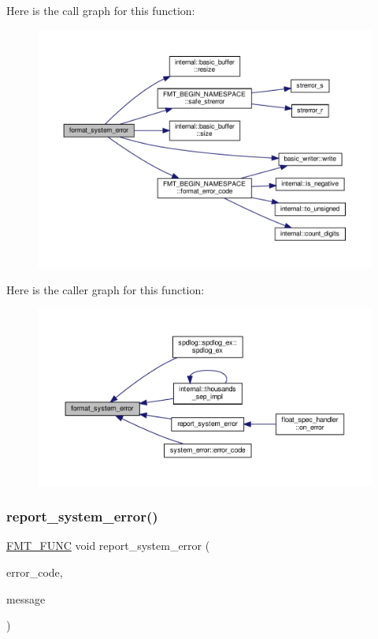 Here is the call graph for this function\+:
\nopagebreak
\begin{figure}[H]
\begin{center}
\leavevmode
\includegraphics[width=350pt]{format-inl_8h_a4826487444d21827180f5fbce3c64508_cgraph}
\end{center}
\end{figure}
Here is the caller graph for this function\+:
\nopagebreak
\begin{figure}[H]
\begin{center}
\leavevmode
\includegraphics[width=350pt]{format-inl_8h_a4826487444d21827180f5fbce3c64508_icgraph}
\end{center}
\end{figure}
\mbox{\label{format-inl_8h_a82b610312f3005c8480b1d8439b129be}} 
\subsubsection{\texorpdfstring{report\+\_\+system\+\_\+error()}{report\_system\_error()}}
{\footnotesize\ttfamily \hyperlink{format_8h_a02c8898388e0ae59aab58be14fcd4e05}{F\+M\+T\+\_\+\+F\+U\+NC} void report\+\_\+system\+\_\+error (\begin{DoxyParamCaption}\item[{int}]{error\+\_\+code,  }\item[{\hyperlink{core_8h_a17e3ff7f9ac2b8f068f719b829890036}{fmt\+::string\+\_\+view}}]{message }\end{DoxyParamCaption})}



